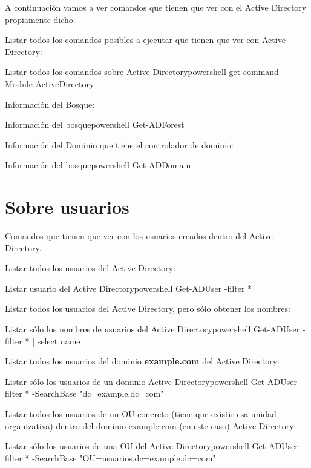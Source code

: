 A continuación  vamos a ver comandos que tienen que ver con el Active Directory propiamente dicho.

Listar todos los comandos posibles a ejecutar que tienen que ver con Active Directory:


\begin{mycode}{Listar todos los comandos sobre Active Directory}{powershell}{}
get-command -Module ActiveDirectory
\end{mycode}


Información del Bosque:
\begin{mycode}{Información del bosque}{powershell}{}
Get-ADForest
\end{mycode}


Información del Dominio que tiene el controlador de dominio:
\begin{mycode}{Información del bosque}{powershell}{}
Get-ADDomain
\end{mycode}


\section{Sobre usuarios}

Comandos que tienen que ver con los usuarios creados dentro del Active Directory.

Listar todos los usuarios del Active Directory:
\begin{mycode}{Listar usuario del Active Directory}{powershell}{}
Get-ADUser -filter *
\end{mycode}

Listar todos los usuarios del Active Directory, pero sólo obtener los nombres:
\begin{mycode}{Listar sólo los nombres de usuarios del Active Directory}{powershell}{}
Get-ADUser -filter * | select name
\end{mycode}


Listar todos los usuarios del dominio \textbf{example.com} del Active Directory:
\begin{mycode}{Listar sólo los  usuarios de un dominio Active Directory}{powershell}{}
Get-ADUser -filter * -SearchBase "dc=example,dc=com"
\end{mycode}


Listar todos los usuarios de un OU concreto (tiene que existir esa unidad organizativa) dentro del dominio example.com (en este caso) Active Directory:
\begin{mycode}{Listar sólo los  usuarios de una OU del Active Directory}{powershell}{}
Get-ADUser -filter * -SearchBase "OU=usuarios,dc=example,dc=com"
\end{mycode}

